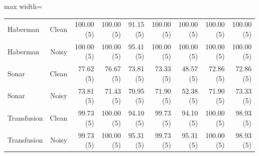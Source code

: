 \begin{kbtable}
\begin{adjustbox}{max width=\linewidth}
\begin{tabular}{lrrrrrrrr}
Haberman & Clean & 100.00 (5) & 100.00 (5) & 91.15 (5) & 100.00 (5) & 100.00 (5) & 100.00 (5) & 100.00 (5) \\
Haberman & Noisy & 100.00 (5) & 100.00 (5) & 95.41 (5) & 100.00 (5) & 100.00 (5) & 100.00 (5) & 100.00 (5) \\
Sonar & Clean & 77.62 (5) & 76.67 (5) & 73.81 (5) & 73.33 (5) & 48.57 (5) & 72.86 (5) & 72.86 (5) \\
Sonar & Noisy & 73.81 (5) & 71.43 (5) & 70.95 (5) & 71.90 (5) & 52.38 (5) & 71.90 (5) & 73.33 (5) \\
Transfusion & Clean & 99.73 (5) & 100.00 (5) & 94.10 (5) & 99.73 (5) & 94.10 (5) & 100.00 (5) & 98.93 (5) \\
Transfusion & Noisy & 99.73 (5) & 100.00 (5) & 95.31 (5) & 99.73 (5) & 95.31 (5) & 100.00 (5) & 98.93 (5) \\
\bottomrule
\end{tabular}
\end{adjustbox}
\end{kbtable}
